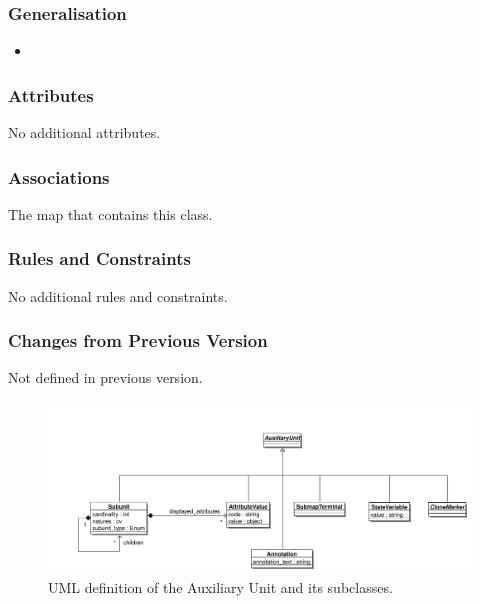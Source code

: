 \subsubsection{Generalisation}

\begin{itemize}
\item {}
\end{itemize}

\subsubsection{Attributes}

No additional attributes.

\subsubsection{Associations}

\begin{attributes}
 The map that contains this class.
\end{attributes}

\subsubsection{Rules and Constraints}

No additional rules and constraints.

\subsubsection{Changes from Previous Version}

Not defined in  previous version.


\label{defn:AuxiliaryUnit}

\begin{figure}[htb]
  \centering
  \includegraphics[width=\textwidth]{images/auxiliaryunituml}
\caption{UML definition of the Auxiliary Unit and its subclasses.}
  \label{fig:techref:auxiliaryunituml}
\end{figure}

